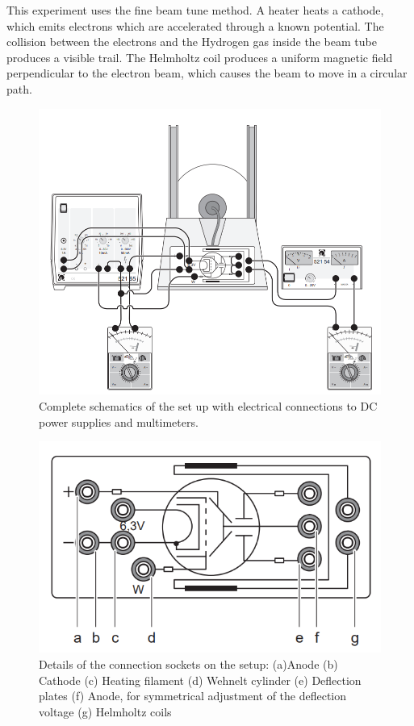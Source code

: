 This experiment uses the fine beam tune method. A heater heats a cathode, which emits electrons which are accelerated through a known potential. The collision between the electrons and the Hydrogen gas inside the beam tube produces a visible trail. The Helmholtz coil produces a uniform magnetic field perpendicular to the electron beam, which causes the beam to move in a circular path.

\begin{figure}[H]
    \centering
    \includegraphics[height=0.6\columnwidth]{images/f3.png}
    \caption{Complete schematics of the set up with electrical connections to DC power supplies and multimeters.}
    \label{fig:3}
\end{figure}

\begin{figure}[H]
    \centering
    \includegraphics[height=0.5\columnwidth]{images/f4.png}
    \caption{Details of the connection sockets on the setup: (a)Anode (b) Cathode (c) Heating filament (d)
    Wehnelt cylinder (e) Deflection plates (f)
    Anode, for symmetrical adjustment of the
    deflection voltage (g) Helmholtz coils}
    \label{fig:4}
\end{figure}
